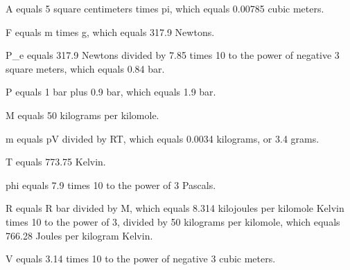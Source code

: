 A equals 5 square centimeters times pi, which equals 0.00785 cubic meters.

F equals m times g, which equals 317.9 Newtons.

P_e equals 317.9 Newtons divided by 7.85 times 10 to the power of negative 3 square meters, which equals 0.84 bar.

P equals 1 bar plus 0.9 bar, which equals 1.9 bar.

M equals 50 kilograms per kilomole.

m equals pV divided by RT, which equals 0.0034 kilograms, or 3.4 grams.

T equals 773.75 Kelvin.

phi equals 7.9 times 10 to the power of 3 Pascals.

R equals R bar divided by M, which equals 8.314 kilojoules per kilomole Kelvin times 10 to the power of 3, divided by 50 kilograms per kilomole, which equals 766.28 Joules per kilogram Kelvin.

V equals 3.14 times 10 to the power of negative 3 cubic meters.